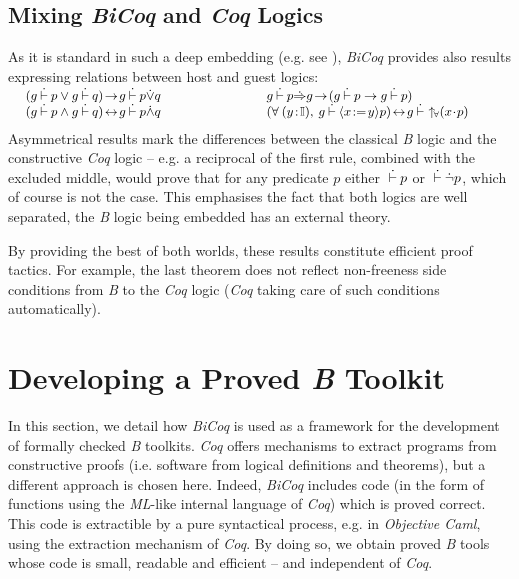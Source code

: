\documentclass{llncs}
\begin{document}
\subsection{Mixing \emph{BiCoq} and \emph{Coq} Logics}\label{ss_mixing}

As it is standard in such a deep embedding (e.g. see \cite{brk:1}), \emph{BiCoq} provides also 
results expressing relations between host and guest logics:
\[
\small
\begin{array}{ll}
\rule{5.7cm}{0pt} & \rule{5.7cm}{0pt} \vspace{-16pt} \\
(g\Binf p\lor g\Binf q)\!\to\!g\Binf p\dot{\lor}q
&
g\Binf p\pimp g\!\to\!(g\Binf p\to g\Binf p)
\\
(g\Binf p\land g\Binf q)\!\leftrightarrow\!g\Binf p\pand q
&
(\forall\:(y\!:\!\Bidx),\:g\Binf\Baffec{x}{y}{p})\!\leftrightarrow\!g\Binf\Bbdfor{x}{p}
\end{array}
\]
Asymmetrical results mark the differences between the classical \emph{B} logic and the 
constructive \emph{Coq} logic -- e.g. a reciprocal of the first rule, combined with the 
excluded middle, would prove that for any predicate $p$ either $\:\dot{\vdash}\: p$ or $\:\dot{\vdash}\: \dot{\lnot} p$, 
which of course is not the case. This emphasises the fact that both logics are well separated, 
the \emph{B} logic being embedded has an external theory.

By providing the best of both worlds, these results constitute efficient proof tactics. For 
example, the last theorem does not reflect non-freeness side conditions from \emph{B} to the 
\emph{Coq} logic (\emph{Coq} taking care of such conditions automatically).

\section{Developing a Proved \emph{B} Toolkit}\label{sc_environ}

In this section, we detail how \emph{BiCoq} is used as a framework for the development of 
formally checked \emph{B} toolkits. \emph{Coq} offers mechanisms to extract programs from 
constructive proofs (i.e. software from logical definitions and theorems), but a different 
approach is chosen here. Indeed, \emph{BiCoq} includes code (in the form of functions using 
the \emph{ML}-like internal language of \emph{Coq}) which is proved correct. This code is 
extractible by a pure syntactical process, e.g. in \emph{Objective Caml}, using the extraction 
mechanism of \emph{Coq}. By doing so, we obtain proved \emph{B} tools whose code is small, 
readable and efficient -- and independent of \emph{Coq}.
\end{document}

